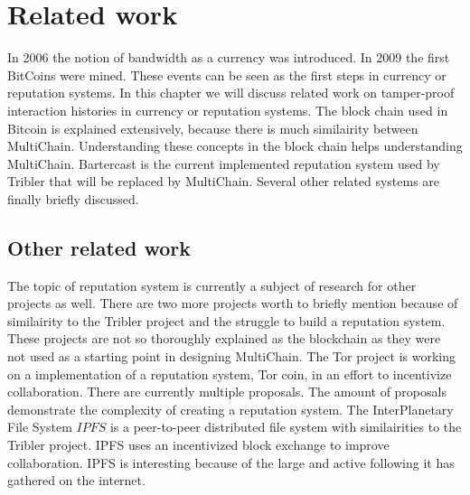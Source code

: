\chapter{Related work}
In 2006 the notion of bandwidth as a currency was introduced.
In 2009 the first BitCoins were mined.
These events can be seen as the first steps in currency or reputation systems.
In this chapter we will discuss related work on tamper-proof interaction histories in currency or reputation systems.
The block chain used in Bitcoin is explained extensively,
because there is much similairity between MultiChain.
Understanding these concepts in the block chain helps understanding MultiChain.
Bartercast is the current implemented reputation system used by Tribler that will be replaced by MultiChain.
Several other related systems are finally briefly discussed.





\section{Other related work}
The topic of reputation system is currently a subject of research for other projects as well.
There are two more projects worth to briefly mention because of similairity to the Tribler project
and the struggle to build a reputation system.
These projects are not so thoroughly explained as the blockchain
as they were not used as a starting point in designing MultiChain.
The Tor project is working on a implementation of a reputation system, Tor coin,
in an effort to incentivize collaboration.
There are currently multiple proposals\cite{androulaki-torincentive}\cite{chen-torincentive}\cite{dingledine-torincentive}\cite{ghosh-torincentive}\cite{jansen-torincentive}.
The amount of proposals demonstrate the complexity of creating a reputation system.
The InterPlanetary File System \(IPFS\) is a peer-to-peer distributed file system with similairities to the Tribler project.
IPFS uses an incentivized block exchange to improve collaboration\cite{benet-ipfs}.
IPFS is interesting because of the large and active following it has gathered on the internet.